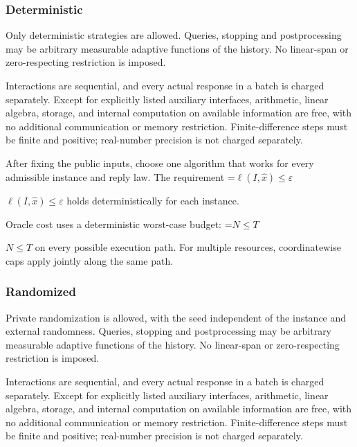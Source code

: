 \documentclass[10pt,a4paper]{article}
\newcommand{\AtlasMath}[1]{\par\begingroup\centering\setbox0=\hbox{$\displaystyle #1$}\ifdim\wd0>1.4\linewidth\typeout{ATLAS WIDE FORMULA: \the\wd0}\fi\ifdim\wd0>\linewidth\resizebox{\linewidth}{!}{\box0}\else\box0\fi\par\endgroup}
\newcommand{\AtlasInlineMath}[1]{\begingroup\setbox0=\hbox{$#1$}\ifdim\wd0>.4\linewidth\endgroup\AtlasMath{#1}\else\endgroup$#1$\fi}
\begin{document}
\subsubsection{Deterministic}


Only deterministic strategies are allowed. Queries, stopping and postprocessing may be arbitrary measurable adaptive functions of the history. No linear-span or zero-respecting restriction is imposed.



Interactions are sequential, and every actual response in a batch is charged separately. Except for explicitly listed auxiliary interfaces, arithmetic, linear algebra, storage, and internal computation on available information are free, with no additional communication or memory restriction. Finite-difference steps must be finite and positive; real-number precision is not charged separately.



After fixing the public inputs, choose one algorithm that works for every admissible instance and reply law. The requirement \AtlasInlineMath{\ell(I,\widehat{x})\le \varepsilon} holds deterministically for each instance.



Oracle cost uses a deterministic worst-case budget: \AtlasInlineMath{N\le T} on every possible execution path. For multiple resources, coordinatewise caps apply jointly along the same path.



\subsubsection{Randomized}


Private randomization is allowed, with the seed independent of the instance and external randomness. Queries, stopping and postprocessing may be arbitrary measurable adaptive functions of the history. No linear-span or zero-respecting restriction is imposed.



Interactions are sequential, and every actual response in a batch is charged separately. Except for explicitly listed auxiliary interfaces, arithmetic, linear algebra, storage, and internal computation on available information are free, with no additional communication or memory restriction. Finite-difference steps must be finite and positive; real-number precision is not charged separately.
\end{document}
